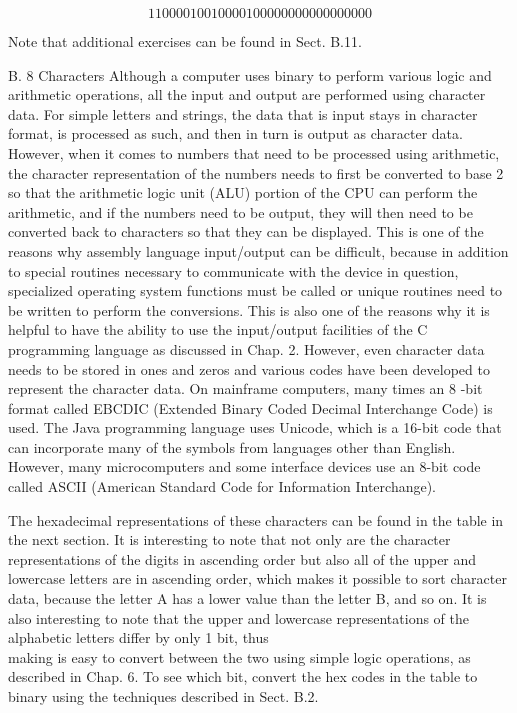 \documentclass[10pt]{book}
\begin{document}
$$
11000010010000100000000000000000
$$

Note that additional exercises can be found in Sect. B.11.

B. 8 Characters
Although a computer uses binary to perform various logic and arithmetic operations, all the input and output are performed using character data. For simple letters and strings, the data that is input stays in character format, is processed as such, and then in turn is output as character data. However, when it comes to numbers that need to be processed using arithmetic, the character representation of the numbers needs to first be converted to base 2 so that the arithmetic logic unit (ALU) portion of the CPU can perform the arithmetic, and if the numbers need to be output, they will then need to be converted back to characters so that they can be displayed. This is one of the reasons why assembly language input/output can be difficult, because in addition to special routines necessary to communicate with the device in question, specialized operating system functions must be called or unique routines need to be written to perform the conversions. This is also one of the reasons why it is helpful to have the ability to use the input/output facilities of the C programming language as discussed in Chap. 2. However, even character data needs to be stored in ones and zeros and various codes have been developed to represent the character data. On mainframe computers, many times an 8 -bit format called EBCDIC (Extended Binary Coded Decimal Interchange Code) is used. The Java programming language uses Unicode, which is a 16-bit code that can incorporate many of the symbols from languages other than English. However, many microcomputers and some interface devices use an 8-bit code called ASCII (American Standard Code for Information Interchange).

The hexadecimal representations of these characters can be found in the table in the next section. It is interesting to note that not only are the character representations of the digits in ascending order but also all of the upper and lowercase letters are in ascending order, which makes it possible to sort character data, because the letter A has a lower value than the letter B, and so on. It is also interesting to note that the upper and lowercase representations of the alphabetic letters differ by only 1 bit, thus\\
making is easy to convert between the two using simple logic operations, as described in Chap. 6. To see which bit, convert the hex codes in the table to binary using the techniques described in Sect. B.2.
\end{document}
